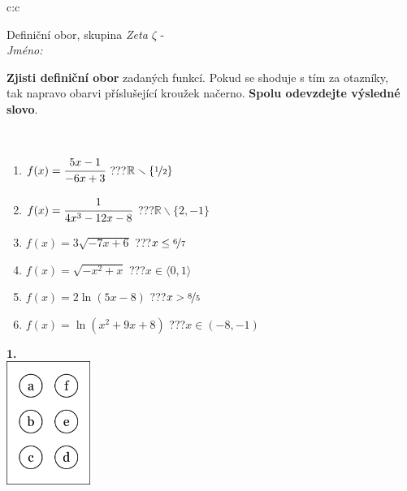 \documentclass[10pt]{report}
\begin{document}
\begin{tabular}{c:c}
\begin{minipage}[c][104.5mm][t]{0.5\linewidth}
\begin{center}
\vspace{7mm}
{\huge Definiční obor, skupina \textit{Zeta $\zeta$} -}\\[5mm]
\textit{Jméno:}\phantom{xxxxxxxxxxxxxxxxxxxxxxxxxxxxxxxxxxxxxxxxxxxxxxxxxxxxxxxxxxxxxxxxx}\\[5mm]
\begin{minipage}{0.95\linewidth}
\begin{center}
\textbf{Zjisti definiční obor} zadaných funkcí. Pokud se shoduje s tím za otazníky,\\tak napravo obarvi příslušející kroužek načerno. \textbf{Spolu odevzdejte výsledné slovo}.
\end{center}
\end{minipage}
\\[1mm]
\begin{minipage}{0.79\linewidth}
\begin{center}
\begin{varwidth}{\linewidth}
\begin{enumerate}
\normalsizerrr
\item $f(x)=\cfrac{5x-1}{-6x+3}$\quad \dotfill\; ???\;\dotfill \quad $\mathbb{R}\smallsetminus\{\nicefrac{1}{2}\}$
\item $f(x)=\cfrac{1}{4x^3-12x-8}$\quad \dotfill\; ???\;\dotfill \quad $\mathbb{R}\smallsetminus\{2,-1\}$
\item $f(x)=3\sqrt{-7x+6}$\quad \dotfill\; ???\;\dotfill \quad $x\leq\nicefrac{6}{7}$
\item $f(x)=\sqrt{-x^2+x}$\quad \dotfill\; ???\;\dotfill \quad $x\in\langle0 , 1\rangle$
\item $f(x)=2\ln{(5x-8)}$\quad \dotfill\; ???\;\dotfill \quad $x>\nicefrac{8}{5}$
\item $f(x)=\ln{(x^2+9x+8)}$\quad \dotfill\; ???\;\dotfill \quad $x\in(-8 , -1)$
\end{enumerate}
\end{varwidth}
\end{center}
\end{minipage}
\begin{minipage}{0.20\linewidth}
\begin{center}
{\Huge\bfseries 1.} \\[2mm]
\includegraphics[height=40mm]{../images/braille.png}

\end{center}
\end{minipage}
\end{center}
\end{minipage}
\end{tabular}
\end{document}
